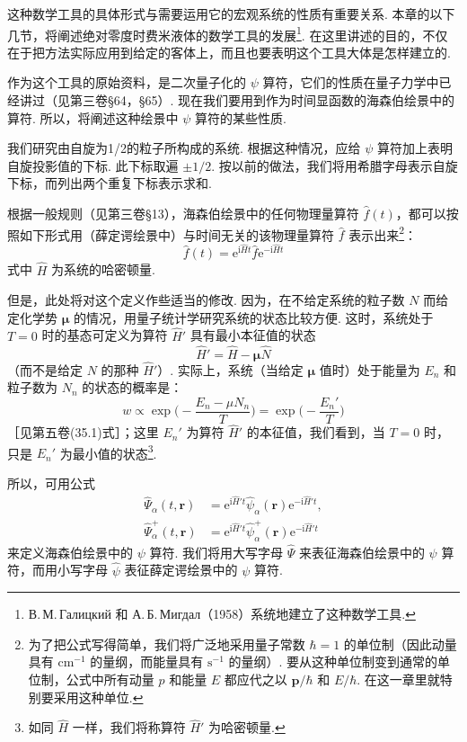 这种数学工具的具体形式与需要运用它的宏观系统的性质有重要关系. 本章的以下几节，将阐述绝对零度时费米液体的数学工具的发展\footnote{В.\,М.\,Галицкий 和 А.\,Б.\,Мигдал（1958）系统地建立了这种数学工具.}. 在这里讲述的目的，不仅在于把方法实际应用到给定的客体上，而且也要表明这个工具大体是怎样建立的.

作为这个工具的原始资料，是二次量子化的 $\psi$ 算符，它们的性质在量子力学中已经讲过（见第三卷§64，§65）. 现在我们要用到作为时间显函数的海森伯绘景中的算符. 所以，将阐述这种绘景中 $\psi$ 算符的某些性质.

我们研究由自旋为1/2的粒子所构成的系统. 根据这种情况，应给 $\psi$ 算符加上表明自旋投影值的下标. 此下标取遍 $\pm 1/2$. 按以前的做法，我们将用希腊字母表示自旋下标，而列出两个重复下标表示求和.

根据一般规则（见第三卷§13），海森伯绘景中的任何物理量算符 $\hat f(t)$，都可以按照如下形式用（薛定谔绘景中）与时间无关的该物理量算符 $\hat f$ 表示出来\footnote{为了把公式写得简单，我们将广泛地采用量子常数 $\hbar=1$ 的单位制（因此动量具有 $\mathrm{cm}^{-1}$ 的量纲，而能量具有 $\mathrm{s}^{-1}$ 的量纲）. 要从这种单位制变到通常的单位制，公式中所有动量 $p$ 和能量 $E$ 都应代之以 $\bm p/\hbar$ 和 $E/\hbar$. 在这一章里就特别要采用这种单位.}：
\begin{equation*}
\hat f(t)=\mathrm{e}^{\mathrm{i}\hat Ht}\hat f\mathrm{e}^{-\mathrm{i}\hat Ht}
\end{equation*}
式中 $\hat H$ 为系统的哈密顿量.

但是，此处将对这个定义作些适当的修改. 因为，在不给定系统的粒子数 $N$ 而给定化学势 $\bm\mu$ 的情况，用量子统计学研究系统的状态比较方便. 这时，系统处于 $T=0$ 时的基态可定义为算符 $\hat H'$ 具有最小本征值的状态
\begin{equation}
\hat H'=\hat H-\bm\mu\hat N
\end{equation}
（而不是给定 $N$ 的那种 $\hat H'$）. 实际上，系统（当给定 $\bm\mu$ 值时）处于能量为 $E_n$ 和粒子数为 $N_n$ 的状态的概率是：
\begin{equation*}
w\propto\exp\bigg(-\frac{E_n-\mu N_n}{T}\bigg)=\exp\bigg(-\frac{E_n'}{T}\bigg)
\end{equation*}
［见第五卷(35.1)式］；这里 $E_n'$ 为算符 $\hat H'$ 的本征值，我们看到，当 $T=0$ 时，只是 $E_n'$ 为最小值的状态\footnote{如同 $\hat H$ 一样，我们将称算符 $\hat H'$ 为哈密顿量.}.

所以，可用公式
\begin{equation}
\begin{aligned}
\hat\Psi_\alpha(t,\bm r)&=\mathrm{e}^{\mathrm{i}\hat H't}\hat\psi_\alpha(\bm r)\mathrm{e}^{-\mathrm{i}\hat H't},\\
\hat\Psi^{+}_\alpha(t,\bm r)&=\mathrm{e}^{\mathrm{i}\hat H't}\hat\psi^{+}_\alpha(\bm r)\mathrm{e}^{-\mathrm{i}\hat H't}
\end{aligned}
\end{equation}
来定义海森伯绘景中的 $\psi$ 算符. 我们将用大写字母 $\hat\Psi$ 来表征海森伯绘景中的 $\psi$ 算符，而用小写字母 $\hat\psi$ 表征薛定谔绘景中的 $\psi$ 算符.

